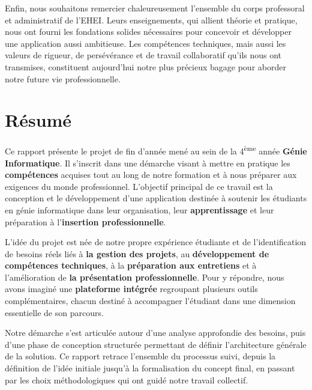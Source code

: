 \documentclass[12pt,a4paper]{report}
\newcommand{\headingfont}{}
\begin{document}
	Enfin, nous souhaitons remercier chaleureusement l'ensemble du corps professoral et administratif de l'EHEI. Leurs enseignements, qui allient théorie et pratique, nous ont fourni les fondations solides nécessaires pour concevoir et développer une application aussi ambitieuse. Les compétences techniques, mais aussi les valeurs de rigueur, de persévérance et de travail collaboratif qu'ils nous ont transmises, constituent aujourd'hui notre plus précieux bagage pour aborder notre future vie professionnelle.
	

	
	\newpage
	\chapter*{{\headingfont Résumé}}
	
	Ce rapport présente le projet de fin d'année mené au sein de la 4\textsuperscript{ème} année \textbf{Génie Informatique}. Il s'inscrit dans une démarche visant à mettre en pratique les \textbf{compétences} acquises tout au long de notre formation et à nous préparer aux exigences du monde professionnel. L'objectif principal de ce travail est la conception et le développement d'une application destinée à soutenir les étudiants en génie informatique dans leur organisation, leur \textbf{apprentissage} et leur préparation à l'\textbf{insertion professionnelle}.
	
	L'idée du projet est née de notre propre expérience étudiante et de l'identification de besoins réels liés à \textbf{la gestion des projets}, au \textbf{développement de compétences techniques}, à la \textbf{préparation aux entretiens} et à l'amélioration de \textbf{la présentation professionnelle}. Pour y répondre, nous avons imaginé une \textbf{plateforme intégrée} regroupant plusieurs outils complémentaires, chacun destiné à accompagner l'étudiant dans une dimension essentielle de son parcours.
	
	Notre démarche s'est articulée autour d'une analyse approfondie des besoins, puis d'une phase de conception structurée permettant de définir l'architecture générale de la solution. Ce rapport retrace l'ensemble du processus suivi, depuis la définition de l'idée initiale jusqu'à la formalisation du concept final, en passant par les choix méthodologiques qui ont guidé notre travail collectif.
	
\end{document}
